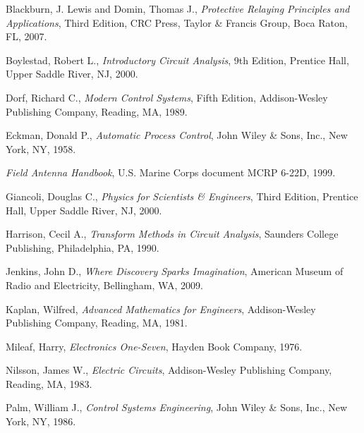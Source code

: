 \noindent
Blackburn, J. Lewis and Domin, Thomas J., \textit{Protective Relaying Principles and Applications}, Third Edition, CRC Press, Taylor \& Francis Group, Boca Raton, FL, 2007.

\vskip 10pt

\noindent
Boylestad, Robert L., \textit{Introductory Circuit Analysis}, 9th Edition, Prentice Hall, Upper Saddle River, NJ, 2000.

\vskip 10pt

\noindent
Dorf, Richard C., \textit{Modern Control Systems}, Fifth Edition, Addison-Wesley Publishing Company, Reading, MA, 1989.

\vskip 10pt

\noindent
Eckman, Donald P., \textit{Automatic Process Control}, John Wiley \& Sons, Inc., New York, NY, 1958.

\vskip 10pt

\noindent
\textit{Field Antenna Handbook}, U.S. Marine Corps document MCRP 6-22D, 1999.

\vskip 10pt

\noindent
Giancoli, Douglas C., \textit{Physics for Scientists \& Engineers}, Third Edition, Prentice Hall, Upper Saddle River, NJ, 2000.

\vskip 10pt

\noindent
Harrison, Cecil A., \textit{Transform Methods in Circuit Analysis}, Saunders College Publishing, Philadelphia, PA, 1990.

\vskip 10pt

\noindent
Jenkins, John D., \textit{Where Discovery Sparks Imagination}, American Museum of Radio and Electricity, Bellingham, WA, 2009.

\vskip 10pt

\noindent
Kaplan, Wilfred, \textit{Advanced Mathematics for Engineers}, Addison-Wesley Publishing Company, Reading, MA, 1981.

\vskip 10pt

\noindent
Mileaf, Harry, \textit{Electronics One-Seven}, Hayden Book Company, 1976.

\vskip 10pt

\noindent
Nilsson, James W., \textit{Electric Circuits}, Addison-Wesley Publishing Company, Reading, MA, 1983.

\vskip 10pt

\noindent
Palm, William J., \textit{Control Systems Engineering}, John Wiley \& Sons, Inc., New York, NY, 1986. 

\vskip 10pt


